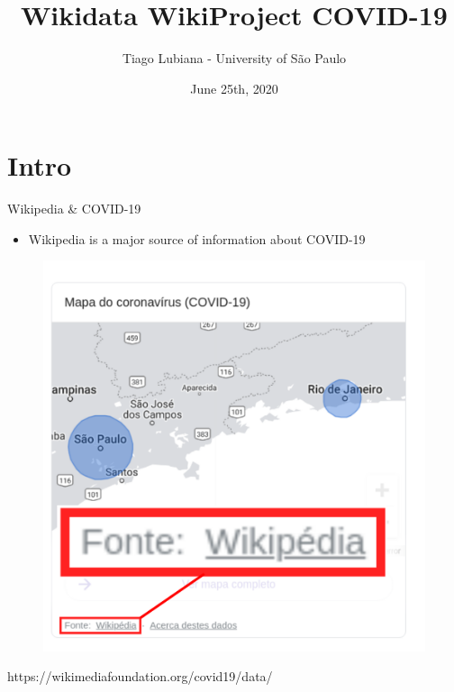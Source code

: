 \documentclass{beamer}
\title[Wikidata WikiProject COVID-19]{Wikidata WikiProject COVID-19}
\author[User:TiagoLubiana]{Tiago Lubiana - University of São Paulo}
\date[25/06/2020]{June 25th, 2020}
\begin{document}
\begin{frame}
  \titlepage
\end{frame}



\section{Intro}

\begin{frame}{Wikipedia & COVID-19}

\begin{itemize}
    \item Wikipedia is a major source of information about COVID-19

\end{itemize}

\begin{figure}
\includegraphics[scale=0.45]{fig/wikipedia_in_google.png}
\end{figure}

 https://wikimediafoundation.org/covid19/data/
 
\end{frame}
\end{document}
